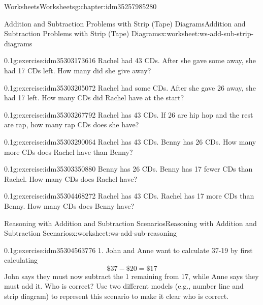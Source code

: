 \documentclass[twoside,11pt,]{book}
\begin{document}
\begin{chapterptx}{Worksheets}{}{Worksheets}{}{}{g:chapter:idm35257985280}
\begin{worksheet-section-numberless}{Addition and Subtraction Problems with Strip (Tape) Diagrams}{}{Addition and Subtraction Problems with Strip (Tape) Diagrams}{}{}{x:worksheet:ws-add-sub-strip-diagrams}
\begin{divisionexercise}{2}{}{0.1}{g:exercise:idm35303173616}
Rachel had 43 CDs.  After she gave some away, she had 17 CDs left.  How many did she give away?%
\end{divisionexercise}%
\begin{divisionexercise}{3}{}{0.1}{g:exercise:idm35303205072}%
Rachel had some CDs.  After she gave 26 away, she had 17 left.  How many CDs did Rachel have at the start?%
\end{divisionexercise}%
\begin{divisionexercise}{4}{}{0.1}{g:exercise:idm35303267792}%
Rachel has 43 CDs.  If 26 are hip hop and the rest are rap, how many rap CDs does she have?%
\end{divisionexercise}%
\begin{divisionexercise}{5}{}{0.1}{g:exercise:idm35303290064}%
Rachel has 43 CDs.  Benny has 26 CDs.  How many more CDs does Rachel have than Benny?%
\end{divisionexercise}%
\begin{divisionexercise}{6}{}{0.1}{g:exercise:idm35303350880}%
Benny has 26 CDs. Benny has 17 fewer CDs than Rachel.  How many CDs does Rachel have?%
\end{divisionexercise}%
\begin{divisionexercise}{7}{}{0.1}{g:exercise:idm35304468272}%
Rachel has 43 CDs. Rachel has 17 more CDs than Benny.  How many CDs does Benny have?%
\end{divisionexercise}%
\end{worksheet-section-numberless}
\restoregeometry
%
%
\typeout{************************************************}
\typeout{************************************************}
%
\begin{worksheet-section-numberless}{Reasoning with Addition and Subtraction Scenarios}{}{Reasoning with Addition and Subtraction Scenarios}{}{}{x:worksheet:ws-add-sub-reasoning}
\begin{divisionexercise}{1}{}{0.1}{g:exercise:idm35304563776}%
1.	John and Anne want to calculate \textdollar{}37-\textdollar{}19 by first calculating%
\begin{equation*}
\$37-\$20=\$17 
\end{equation*}
John says they must now subtract the \textdollar{}1 remaining from \textdollar{}17, while Anne says they must add it.  Who is correct?  Use two different models (e.g., number line and strip diagram) to represent this scenario to make it clear who is correct.%

\end{divisionexercise}
\end{worksheet-section-numberless}
\end{chapterptx}
\end{document}
